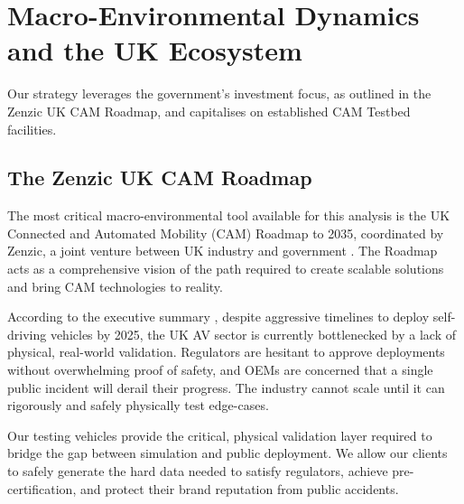 \section{Macro-Environmental Dynamics and the UK Ecosystem}

Our strategy leverages the government's investment focus, as outlined in the Zenzic UK CAM Roadmap, and capitalises on established CAM Testbed facilities.

\subsection{The Zenzic UK CAM Roadmap}

The most critical macro-environmental tool available for this analysis is the UK Connected and Automated Mobility (CAM) Roadmap to 2035, coordinated by Zenzic, a joint venture between UK industry and government \cite{zenzic_about}. The Roadmap acts as a comprehensive vision of the path required to create scalable solutions and bring CAM technologies to reality.

According to the executive summary \cite[p.~5,11,14]{cracknell_2023}, despite aggressive timelines to deploy self-driving vehicles by 2025, the UK AV sector is currently bottlenecked by a lack of physical, real-world validation. Regulators are hesitant to approve deployments without overwhelming proof of safety, and OEMs are concerned that a single public incident will derail their progress. The industry cannot scale until it can rigorously and safely physically test edge-cases.

Our testing vehicles provide the critical, physical validation layer required to bridge the gap between simulation and public deployment. We allow our clients to safely generate the hard data needed to satisfy regulators, achieve pre-certification, and protect their brand reputation from public accidents.

